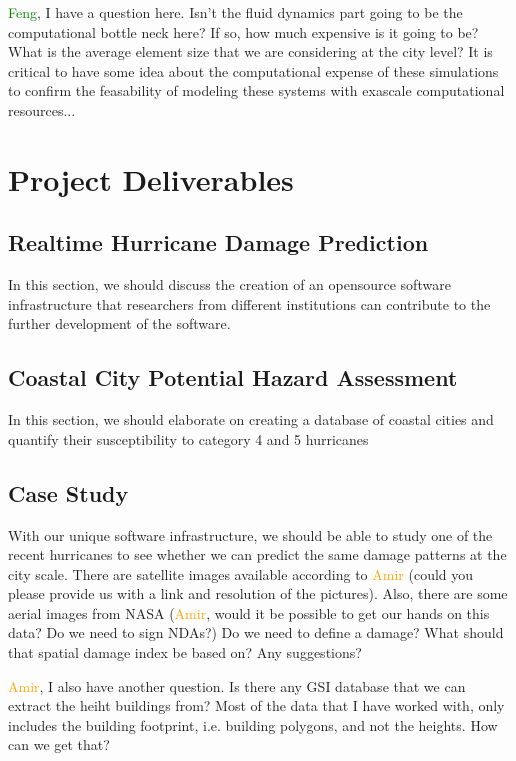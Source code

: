 \documentclass{proposalnsf}
\begin{document}
\textcolor{green}{Feng}, I have a question here. Isn't the fluid dynamics part going to be the computational bottle neck here? If so, how much expensive is it going to be? What is the average element size that we are considering at the city level? It is critical to have some idea about the computational expense of these simulations to confirm the feasability of modeling these systems with exascale computational resources... 

\section{Project Deliverables}
\subsection{Realtime Hurricane Damage Prediction} In this section, we should discuss the creation of an opensource software infrastructure that researchers from different institutions can contribute to the further development of the software. 

\subsection{Coastal City Potential Hazard Assessment} In this section, we should elaborate on creating a database of coastal cities and quantify their susceptibility to category 4 and 5 hurricanes

\subsection{Case Study} With our unique software infrastructure, we should be able to study one of the recent hurricanes to see whether we can predict the same damage patterns at the city scale. There are satellite images available according to \textcolor{orange}{Amir} (could you please provide us with a link and resolution of the pictures). Also, there are some aerial images from NASA (\textcolor{orange}{Amir}, would it be possible to get our hands on this data? Do we need to sign NDAs?) Do we need to define a damage? What should that spatial damage index be based on? Any suggestions?

\textcolor{orange}{Amir}, I also have another question. Is there any GSI database that we can extract the heiht buildings from? Most of the data that I have worked with, only includes the building footprint, i.e. building polygons, and not the heights. How can we get that?
\end{document}
